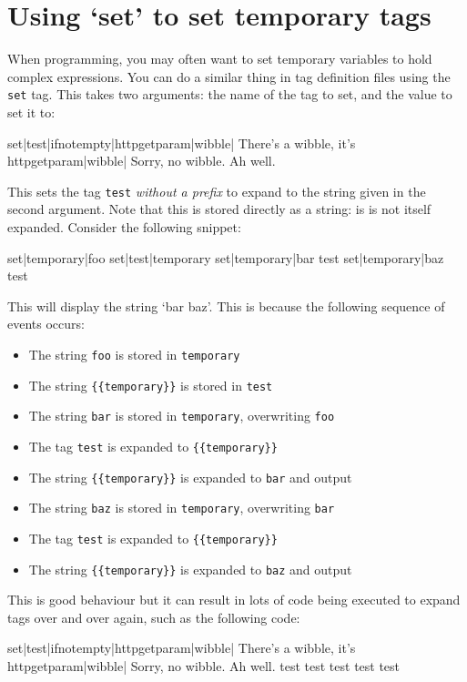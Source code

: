 \section{Using `set' to set temporary tags}
When programming, you may often want to set temporary variables to hold complex expressions. You can
do a similar thing in tag definition files using the \texttt{set} tag. This takes two arguments: the name
of the tag to set, and the value to set it to:
\begin{MyVerbatim}
{{set|test|{{ifnotempty|{{httpgetparam|wibble}}|
    There's a wibble, it's {{httpgetparam|wibble}}|
    Sorry, no wibble. Ah well.}}}}
\end{MyVerbatim}
This sets the tag \texttt{test} \emph{without a prefix} to expand to the string given in the second argument.
Note that this is stored directly as a string: is is not itself expanded. Consider the following snippet:
\begin{MyVerbatim}
{{set|temporary|foo}}
{{set|test|{{temporary}}}}
{{set|temporary|bar}}
{{test}}
{{set|temporary|baz}}
{{test}}
\end{MyVerbatim}
This will display the string `bar baz'. This is because the following sequence of events occurs:
\begin{itemize}
\item The string \texttt{foo} is stored in \texttt{temporary}
\item The string \verb,{{temporary}}, is stored in \texttt{test}
\item The string \texttt{bar} is stored in \texttt{temporary}, overwriting \texttt{foo}
\item The tag \texttt{test} is expanded to \verb,{{temporary}},
\item The string \verb,{{temporary}}, is expanded to \texttt{bar} and output
\item The string \texttt{baz} is stored in \texttt{temporary}, overwriting \texttt{bar}
\item The tag \texttt{test} is expanded to \verb,{{temporary}},
\item The string \verb,{{temporary}}, is expanded to \texttt{baz} and output
\end{itemize}
This is good behaviour but it can result in lots of code being executed to expand tags over and over again,
such as the following code:
\begin{MyVerbatim}
{{set|test|{{ifnotempty|{{httpgetparam|wibble}}|
    There's a wibble, it's {{httpgetparam|wibble}}|
    Sorry, no wibble. Ah well.}}}}
{{test}}    
{{test}}    
{{test}}    
{{test}}    
{{test}}    
\end{MyVerbatim}
